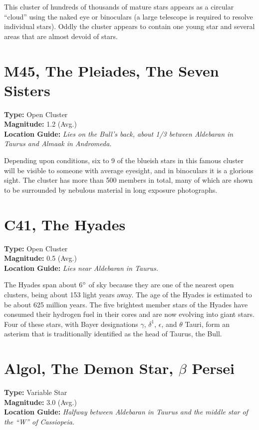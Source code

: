 This cluster of hundreds of thousands of mature stars appears as
a circular ``cloud'' using the naked eye or binoculars (a large
telescope is required to resolve individual stars). Oddly the cluster
appears to contain one young star and several areas that are almost
devoid of stars.

\section{M45, The Pleiades, The Seven Sisters}
\textbf{Type:} Open Cluster \\
\textbf{Magnitude:} 1.2 (Avg.) \\
\textbf{Location Guide:} \textit{Lies on the Bull's back, about 1/3 between Aldebaran in Taurus and Almaak in Andromeda.} 

Depending upon conditions, six to 9 of the blueish stars in this
famous cluster will be visible to someone with average eyesight, and in
binoculars it is a glorious sight. The cluster has more than 500
members in total, many of which are shown to be surrounded by nebulous
material in long exposure photographs.

\section{C41, The Hyades}
\textbf{Type:} Open Cluster \\
\textbf{Magnitude:} 0.5 (Avg.) \\
\textbf{Location Guide:} \textit{Lies near Aldebaran in Taurus.} 

The Hyades span about 6$\degree$ of sky because they are one of the nearest open clusters, being about 153 light years away.
The age of the Hyades is estimated to be about 625 million years.
The five brightest member stars of the Hyades have consumed their hydrogen fuel in their cores and are now evolving into giant stars.
Four of these stars, with Bayer designations $\gamma$, $\delta^1$, $\epsilon$, and $\theta$ Tauri, form an asterism that is traditionally identified as the head of Taurus, the Bull.


\section{Algol, The Demon Star, \texorpdfstring{$\beta$}{beta} Persei}
\textbf{Type:} Variable Star \\
\textbf{Magnitude:} 3.0 (Avg.) \\
\textbf{Location Guide:} \textit{Halfway between Aldebaran in Taurus and the middle star of the ``W'' of Cassiopeia.}

